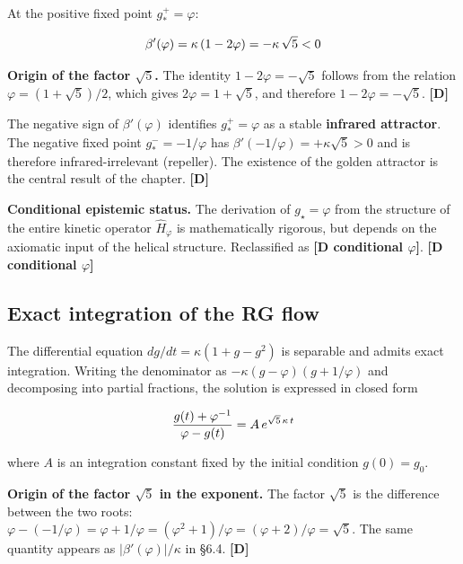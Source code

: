 ﻿\documentclass[11pt,letterpaper]{article}
\begin{document}
At the positive fixed point $g_*^+ = \varphi$:

\begin{equation*}
  \resizebox{\ifdim\width>\linewidth \linewidth\else\width\fi}{!}{$\displaystyle \beta'(\varphi) = \kappa\,(1 - 2\varphi) = -\kappa\,\sqrt{5} < 0$}
\end{equation*}

\textbf{Origin of the factor $\sqrt{5}$.} The identity $1 - 2\varphi = -\sqrt{5}$ follows from the relation $\varphi = (1 + \sqrt{5})/2$, which gives $2\varphi = 1 + \sqrt{5}$, and therefore $1 - 2\varphi = -\sqrt{5}$. \textbf{[D]}

The negative sign of $\beta'(\varphi)$ identifies $g_*^+ = \varphi$ as a stable \textbf{infrared attractor}. The negative fixed point $g_*^- = -1/\varphi$ has $\beta'(-1/\varphi) = +\kappa\sqrt{5} > 0$ and is therefore infrared-irrelevant (repeller). The existence of the golden attractor is the central result of the chapter. \textbf{[D]}

\textbf{Conditional epistemic status.} The derivation of $g_\star = \varphi$ from the structure of the entire kinetic operator $\hat{H}_\varphi$ is mathematically rigorous, but depends on the axiomatic input of the helical structure. Reclassified as \textbf{[D conditional $\varphi$]}. \textbf{[D conditional $\varphi$]}
\subsection{Exact integration of the RG flow}
The differential equation $dg/dt = \kappa(1 + g - g^2)$ is separable and admits exact integration. Writing the denominator as $-\kappa(g - \varphi)(g + 1/\varphi)$ and decomposing into partial fractions, the solution is expressed in closed form

\begin{equation*}
  \resizebox{\ifdim\width>\linewidth \linewidth\else\width\fi}{!}{$\displaystyle \frac{g(t) + \varphi^{-1}}{\varphi - g(t)} = A\,e^{\sqrt{5}\,\kappa\,t}$}
\end{equation*}

where $A$ is an integration constant fixed by the initial condition $g(0) = g_0$.

\textbf{Origin of the factor $\sqrt{5}$ in the exponent.} The factor $\sqrt{5}$ is the difference between the two roots: $\varphi - (-1/\varphi) = \varphi + 1/\varphi = (\varphi^2 + 1)/\varphi = (\varphi + 2)/\varphi = \sqrt{5}$. The same quantity appears as $|\beta'(\varphi)|/\kappa$ in §6.4. \textbf{[D]}
\end{document}
